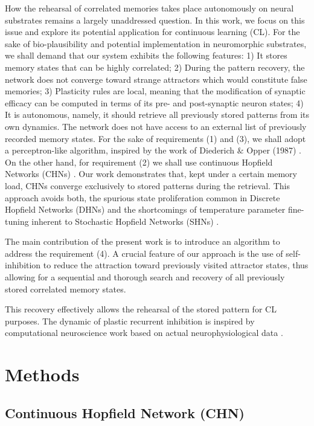 \documentclass[10pt,letterpaper]{article}
\begin{document}
How the rehearsal of correlated memories takes place autonomously on neural substrates remains a largely unaddressed question. In this work, we focus on this issue and explore its potential application for continuous learning (CL).
For the sake of bio-plausibility and potential implementation in neuromorphic substrates, we shall demand that our system exhibits the following features: 
1) It stores memory states that can be highly correlated; 
2) During the pattern recovery, the network does not converge toward strange attractors which would constitute false memories;
3) Plasticity rules are local, meaning that the modification of synaptic efficacy can be computed in terms of its pre- and post-synaptic neuron states; 
4) It is autonomous, namely, it should retrieve all previously stored patterns from its own dynamics. The network does not have access to an external list of previously recorded memory states. 
For the sake of requirements (1) and (3), we shall adopt a perceptron-like algorithm, inspired by the work of Diederich
$\&$ Opper (1987) \cite{diederich_learning_1987}. 
On the other hand, for requirement (2) we shall use continuous Hopfield Networks (CHNs) \cite{hopfield_neurons_1984}. Our work demonstrates that, kept under a certain memory load, CHNs converge exclusively to stored patterns during the retrieval. This approach avoids both, the spurious state proliferation common in Discrete Hopfield Networks (DHNs) and the shortcomings of temperature parameter fine-tuning inherent to Stochastic Hopfield Networks (SHNs) \cite{amit_storing_1985}. 

The main contribution of the present work is to introduce an algorithm to address the requirement (4). A crucial feature of our approach is the use of self-inhibition to reduce the attraction toward previously visited attractor states, thus allowing for a sequential and thorough search and recovery of all previously stored correlated memory states.

This recovery effectively allows the rehearsal of the stored pattern for CL purposes.
The dynamic of plastic recurrent inhibition is inspired by computational neuroscience work based on actual neurophysiological data \cite{vogels_inhibitory_2011}.


\section{Methods}
\subsection{Continuous Hopfield Network (CHN)}
\end{document}

